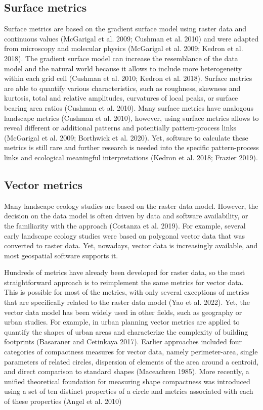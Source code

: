 \documentclass[
  10pt,
  a4paperpaper,
]{article}
\begin{document}
\subsection{Surface metrics}\label{surface-metrics}

Surface metrics are based on the gradient surface model using raster
data and continuous values (McGarigal et al. 2009; Cushman et al. 2010)
and were adapted from microscopy and molecular physics (McGarigal et al.
2009; Kedron et al. 2018). The gradient surface model can increase the
resemblance of the data model and the natural world because it allows to
include more heterogeneity within each grid cell (Cushman et al. 2010;
Kedron et al. 2018). Surface metrics are able to quantify various
characteristics, such as roughness, skewness and kurtosis, total and
relative amplitudes, curvatures of local peaks, or surface bearing area
ratios (Cushman et al. 2010). Many surface metrics have analogous
landscape metrics (Cushman et al. 2010), however, using surface metrics
allows to reveal different or additional patterns and potentially
pattern-process links (McGarigal et al. 2009; Borthwick et al. 2020).
Yet, software to calculate these metrics is still rare and further
research is needed into the specific pattern-process links and
ecological meaningful interpretations (Kedron et al. 2018; Frazier
2019).

\subsection{Vector metrics}\label{vector-metrics}

Many landscape ecology studies are based on the raster data model.
However, the decision on the data model is often driven by data and
software availability, or the familiarity with the approach (Costanza et
al. 2019). For example, several early landscape ecology studies were
based on polygonal vector data that was converted to raster data. Yet,
nowadays, vector data is increasingly available, and most geospatial
software supports it.

Hundreds of metrics have already been developed for raster data, so the
most straightforward approach is to reimplement the same metrics for
vector data. This is possible for most of the metrics, with only several
exceptions of metrics that are specifically related to the raster data
model (Yao et al. 2022). Yet, the vector data model has been widely used
in other fields, such as geography or urban studies. For example, in
urban planning vector metrics are applied to quantify the shapes of
urban areas and characterize the complexity of building footprints
(Basaraner and Cetinkaya 2017). Earlier approaches included four
categories of compactness measures for vector data, namely
perimeter-area, single parameters of related circles, dispersion of
elements of the area around a centroid, and direct comparison to
standard shapes (Maceachren 1985). More recently, a unified theoretical
foundation for measuring shape compactness was introduced using a set of
ten distinct properties of a circle and metrics associated with each of
these properties (Angel et al. 2010)
\end{document}
